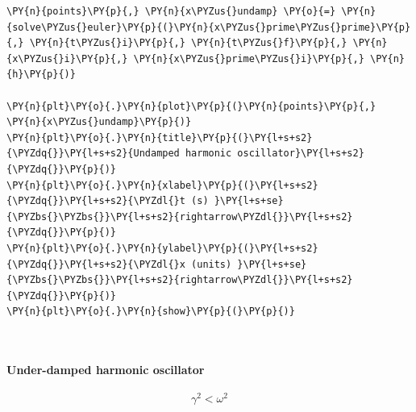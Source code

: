     \begin{tcolorbox}[breakable, size=fbox, boxrule=1pt, pad at break*=1mm,colback=cellbackground, colframe=cellborder]
\begin{Verbatim}[commandchars=\\\{\}]
\PY{n}{points}\PY{p}{,} \PY{n}{x\PYZus{}undamp} \PY{o}{=} \PY{n}{solve\PYZus{}euler}\PY{p}{(}\PY{n}{x\PYZus{}prime\PYZus{}prime}\PY{p}{,} \PY{n}{t\PYZus{}i}\PY{p}{,} \PY{n}{t\PYZus{}f}\PY{p}{,} \PY{n}{x\PYZus{}i}\PY{p}{,} \PY{n}{x\PYZus{}prime\PYZus{}i}\PY{p}{,} \PY{n}{h}\PY{p}{)}

\PY{n}{plt}\PY{o}{.}\PY{n}{plot}\PY{p}{(}\PY{n}{points}\PY{p}{,} \PY{n}{x\PYZus{}undamp}\PY{p}{)}
\PY{n}{plt}\PY{o}{.}\PY{n}{title}\PY{p}{(}\PY{l+s+s2}{\PYZdq{}}\PY{l+s+s2}{Undamped harmonic oscillator}\PY{l+s+s2}{\PYZdq{}}\PY{p}{)}
\PY{n}{plt}\PY{o}{.}\PY{n}{xlabel}\PY{p}{(}\PY{l+s+s2}{\PYZdq{}}\PY{l+s+s2}{\PYZdl{}t (s) }\PY{l+s+se}{\PYZbs{}\PYZbs{}}\PY{l+s+s2}{rightarrow\PYZdl{}}\PY{l+s+s2}{\PYZdq{}}\PY{p}{)}
\PY{n}{plt}\PY{o}{.}\PY{n}{ylabel}\PY{p}{(}\PY{l+s+s2}{\PYZdq{}}\PY{l+s+s2}{\PYZdl{}x (units) }\PY{l+s+se}{\PYZbs{}\PYZbs{}}\PY{l+s+s2}{rightarrow\PYZdl{}}\PY{l+s+s2}{\PYZdq{}}\PY{p}{)}
\PY{n}{plt}\PY{o}{.}\PY{n}{show}\PY{p}{(}\PY{p}{)}
\end{Verbatim}
\end{tcolorbox}

    \begin{center}
    \end{center}
    { \hspace*{\fill} \\}
    
    \hypertarget{under-damped-harmonic-oscillator}{%
\paragraph{Under-damped harmonic
oscillator}\label{under-damped-harmonic-oscillator}}

\[\gamma^2 < \omega^2\]

